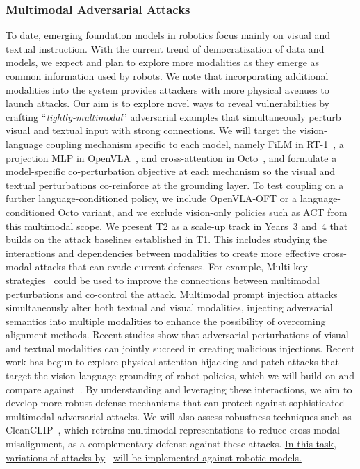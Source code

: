 \subsubsection{Multimodal Adversarial Attacks} \label{sec:t2_attacks}
To date, emerging foundation models in robotics focus mainly on visual and textual instruction. With the current trend of democratization of data and models, we expect and plan to explore more modalities as they emerge as common information used by robots.
We note that incorporating additional modalities into the system provides attackers with more physical avenues to launch attacks.
\ul{Our aim is to explore novel ways to reveal vulnerabilities by crafting ``\textit{tightly-multimodal}'' adversarial examples that simultaneously perturb visual and textual input with strong connections.} 
We will target the vision-language coupling mechanism specific to each model, namely FiLM in RT-1~\cite{rt-1}, a projection MLP in OpenVLA~\cite{kim2024openvla}, and cross-attention in Octo~\cite{team2024octo}, and formulate a model-specific co-perturbation objective at each mechanism so the visual and textual perturbations co-reinforce at the grounding layer. To test coupling on a further language-conditioned policy, we include OpenVLA-OFT or a language-conditioned Octo variant, and we exclude vision-only policies such as ACT from this multimodal scope. We present T2 as a scale-up track in Years~3 and~4 that builds on the attack baselines established in T1.
This includes studying the interactions and dependencies between modalities to create more effective cross-modal attacks that can evade current defenses. For example, Multi-key strategies~\cite{walmer2022dual} could be used to improve the connections between multimodal perturbations and co-control the attack.
Multimodal prompt injection attacks simultaneously alter both textual and visual modalities, injecting adversarial semantics into multiple modalities to enhance the possibility of overcoming alignment methods.
Recent studies \cite{qi2024visual,shayegani2023jailbreak} show that adversarial perturbations of visual and textual modalities can jointly succeed in creating malicious injections.
Recent work has begun to explore physical attention-hijacking and patch attacks that target the vision-language grounding of robot policies, which we will build on and compare against~\cite{zhang2026structure,yin2026vlaguard}.
By understanding and leveraging these interactions, we aim to develop more robust defense mechanisms that can protect against sophisticated multimodal adversarial attacks. We will also assess robustness techniques such as CleanCLIP~\cite{bansal2023cleanclip}, which retrains multimodal representations to reduce cross-modal misalignment, as a complementary defense against these attacks.
\ul{In this task, variations of attacks by}~{\cite{qi2024visual,walmer2022dual}} \ul{will be implemented against robotic models.}


